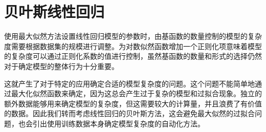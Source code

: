 \section{贝叶斯线性回归}
使用最大似然方法设置线性回归模型的参数时，由基函数的数量控制的模型的复杂度需要根据数据集的规模进行调整。为对数似然函数增加一个正则化项意味着模型的复杂度可以通过正则化系数的值进行控制，虽然基函数的数量和形式的选择仍然对于确定模型的整体行为十分重要。

这就产生了对于特定的应用确定合适的模型复杂度的问题。这个问题不能简单地通过最大化似然函数来确定，因为这总会产生过于复杂的模型和过拟合现象。独立的额外数据能够用来确定模型的复杂度，但这需要较大的计算量，并且浪费了有价值的数据。因此我们转而考虑线性回归的贝叶斯方法，这会避免最大似然的过拟合问题，也会引出使用训练数据本身确定模型复杂度的自动化方法。